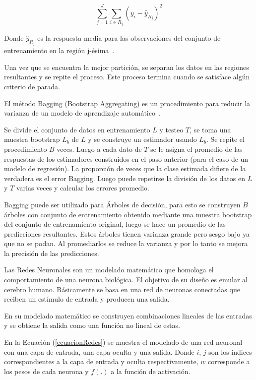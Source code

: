 \documentclass[a4paper,12pt,twocolumn]{article}
\begin{document}
\begin{equation}
\sum_{j=1}^{J} \sum_{i \in R_{j}}\left(y_{i}-\hat{y}_{R_{j}}\right)^{2}
\label{ecuacionTree}
\end{equation}


Donde $\hat{y}_{R_{j}}$ es la respuesta media para las observaciones del conjunto de entrenamiento en la región j-ésima~\cite{libroCurso}.

Una vez que se encuentra la mejor partición, se separan los datos en las regiones resultantes y se repite el proceso. Este proceso termina cuando se satisface algún criterio de parada.

El método Bagging (Bootstrap Aggregating) es un procedimiento para reducir la varianza de un modelo de aprendizaje automático~\cite{libroCurso}.

Se divide el conjunto de datos en entrenamiento $L$ y testeo $T$, se toma una muestra bootstrap $L_b$ de $L$ y se construye un estimador usando $L_b$. Se repite el procedimiento $B$ veces. Luego a cada dato de $T$ se le asigna el promedio de las respuestas de los estimadores construidos en el paso anterior (para el caso de un modelo de regresión). La proporción de veces que la clase estimada difiere de la verdadera es el error Bagging. Luego puede repetirse la división de los datos en $L$ y $T$ varias veces y calcular los errores promedio.

Bagging puede ser utilizado para Árboles de decisión, para esto se construyen $B$ árboles con conjunto de entrenamiento obtenido mediante una muestra bootstrap del conjunto de entrenamiento original, luego se hace un promedio de las predicciones resultantes. Estos árboles tienen varianza grande pero sesgo bajo ya que no se podan. Al promediarlos se reduce la varianza y por lo tanto se mejora la precisión de las predicciones.

Las Redes Neuronales son un modelado matemático que homologa el comportamiento de una neurona biológica. El objetivo de su diseño es emular al cerebro humano. Básicamente se basa en una red de neuronas conectadas que reciben un estímulo de entrada y producen una salida.   

En su modelado matemático se construyen combinaciones lineales de las entradas y se obtiene la salida como una función no lineal de estas. 

En la Ecuación (\ref{ecuacionRedes}) se muestra el modelado de una red neuronal con una capa de entrada, una capa oculta y una salida. Donde $i$, $j$ son los índices correspondientes a la capa de entrada y oculta respectivamente, $w$ corresponde a los pesos de cada neurona y $f(.)$ a la función de activación.
\end{document}
